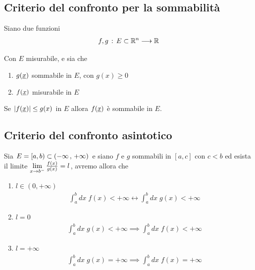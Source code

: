 \newpage

\subsection{Criterio del confronto per la sommabilità}

Siano due funzioni
\begin{align}
	f,g \, : \, E \subset \mathbb{R}^n \longrightarrow \mathbb{R}
\end{align}

Con $E$ misurabile, e sia che
\begin{enumerate}
	\item $g(\underline{x})$ sommabile in $E$, con $g(x)\geq 0$
	\item $f(\underline{x})$ misurabile in $E$
\end{enumerate}	

Se $|f(\underline{x})|\leq g(x) $ \qo in $E$ allora $f(\underline{x})$ è sommabile in $E$.

\subsection{Criterio del confronto asintotico}

Sia $E= [a,b)\subset (-\infty \, , \, +\infty)$ e siano $f$ e $g$ sommabili in $[a,c]$ con $c<b$ ed esista il limite $\underset{x \rightarrow b^-}{\lim} \, \frac{f(x)}{g(x)}=l$, avremo allora che
\begin{enumerate}
	\item $l \in (0,+\infty)$
	\begin{align}
		\int_{a}^{b} dx \; f(x) < +\infty \leftrightarrow \int_{a}^{b} dx \; g(x) < +\infty
	\end{align}
	\item $l=0$
	\begin{align}
		\int_{a}^{b} dx \; g(x) < +\infty \implies \int_{a}^{b} dx \; f(x) < +\infty
	\end{align}
	\item $l =+\infty$
	\begin{align}
		\int_{a}^{b} dx \; g(x) = +\infty \implies 	\int_{a}^{b} dx \; f(x) = +\infty
	\end{align}
\end{enumerate}

\begin{figure}[!htb]
\end{figure}

